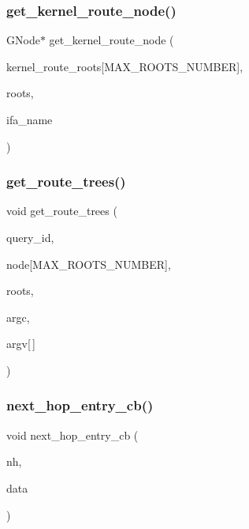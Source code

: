 \subsubsection{\texorpdfstring{get\+\_\+kernel\+\_\+route\+\_\+node()}{get\_kernel\_route\_node()}}
{\footnotesize\ttfamily G\+Node$\ast$ get\+\_\+kernel\+\_\+route\+\_\+node (\begin{DoxyParamCaption}\item[{G\+Node $\ast$}]{kernel\+\_\+route\+\_\+roots\mbox{[}\+M\+A\+X\+\_\+\+R\+O\+O\+T\+S\+\_\+\+N\+U\+M\+B\+E\+R\mbox{]},  }\item[{int}]{roots,  }\item[{char $\ast$}]{ifa\+\_\+name }\end{DoxyParamCaption})}

\mbox{\label{route-tree_8c_a7e256826bca6c828a8564f27f84dd517}} 
\subsubsection{\texorpdfstring{get\+\_\+route\+\_\+trees()}{get\_route\_trees()}}
{\footnotesize\ttfamily void get\+\_\+route\+\_\+trees (\begin{DoxyParamCaption}\item[{enum \hyperlink{route-tree_8c_aed8cdbb52dbe32c343a8c26887888e7f}{R\+O\+U\+T\+E\+\_\+\+Q\+U\+E\+RY}}]{query\+\_\+id,  }\item[{G\+Node $\ast$}]{node\mbox{[}\+M\+A\+X\+\_\+\+R\+O\+O\+T\+S\+\_\+\+N\+U\+M\+B\+E\+R\mbox{]},  }\item[{int $\ast$}]{roots,  }\item[{int}]{argc,  }\item[{char $\ast$}]{argv\mbox{[}$\,$\mbox{]} }\end{DoxyParamCaption})}

\mbox{\label{route-tree_8c_a8402c2baca9819b3791b35b6c1645ce6}} 
\subsubsection{\texorpdfstring{next\+\_\+hop\+\_\+entry\+\_\+cb()}{next\_hop\_entry\_cb()}}
{\footnotesize\ttfamily void next\+\_\+hop\+\_\+entry\+\_\+cb (\begin{DoxyParamCaption}\item[{struct rtnl\+\_\+nexthop $\ast$}]{nh,  }\item[{void $\ast$}]{data }\end{DoxyParamCaption})}

